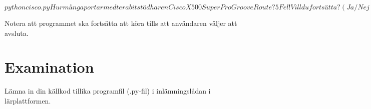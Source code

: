 \documentclass[a4paper]{miunasgn}
\begin{document}
\begin{terminal}[float,label={lst:output},caption={Exempel på utmatning från 
  programmet.}]
$ python cisco.py
Hur många portar med terabitstöd har en Cisco X500 SuperPro GrooveRoute?
5
Fel!
Vill du fortsätta? (Ja/Nej)
Ja
Vad heter Ciscos nuvarande VD?
Rutger Blinka
Fel!
Vill du fortsätta? (Ja/Nej)
Nej
Du hade 0%
$
\end{terminal}

Notera att programmet ska fortsätta att köra tills att användaren väljer att 
avsluta.


\section{Examination}
\label{sec:exam}
Lämna in din källkod tillika programfil (.py-fil) i inlämningslådan 
i lärplattformen.

%  


\printbibliography
\end{document}

